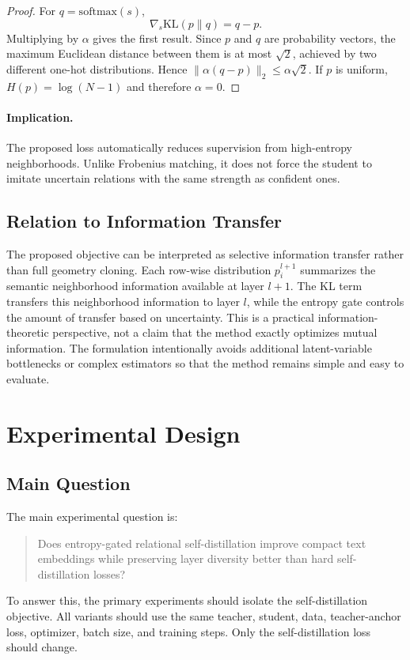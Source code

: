 \documentclass[letterpaper]{article}
\begin{document}
\begin{proof}
For $q=\mathrm{softmax}(s)$,
\begin{equation}
    \nabla_s\mathrm{KL}(p\|q)=q-p.
\end{equation}
Multiplying by $\alpha$ gives the first result. Since $p$ and $q$ are probability vectors, the maximum Euclidean distance between them is at most $\sqrt{2}$, achieved by two different one-hot distributions. Hence $\|\alpha(q-p)\|_2\leq\alpha\sqrt{2}$. If $p$ is uniform, $H(p)=\log(N-1)$ and therefore $\alpha=0$.
\end{proof}

\paragraph{Implication.}
The proposed loss automatically reduces supervision from high-entropy neighborhoods. Unlike Frobenius matching, it does not force the student to imitate uncertain relations with the same strength as confident ones.

\subsection{Relation to Information Transfer}

The proposed objective can be interpreted as selective information transfer rather than full geometry cloning. Each row-wise distribution $p_i^{l+1}$ summarizes the semantic neighborhood information available at layer $l+1$. The KL term transfers this neighborhood information to layer $l$, while the entropy gate controls the amount of transfer based on uncertainty. This is a practical information-theoretic perspective, not a claim that the method exactly optimizes mutual information. The formulation intentionally avoids additional latent-variable bottlenecks or complex estimators so that the method remains simple and easy to evaluate.

\section{Experimental Design}

\subsection{Main Question}

The main experimental question is:
\begin{quote}
Does entropy-gated relational self-distillation improve compact text embeddings while preserving layer diversity better than hard self-distillation losses?
\end{quote}
To answer this, the primary experiments should isolate the self-distillation objective. All variants should use the same teacher, student, data, teacher-anchor loss, optimizer, batch size, and training steps. Only the self-distillation loss should change.
\end{document}
